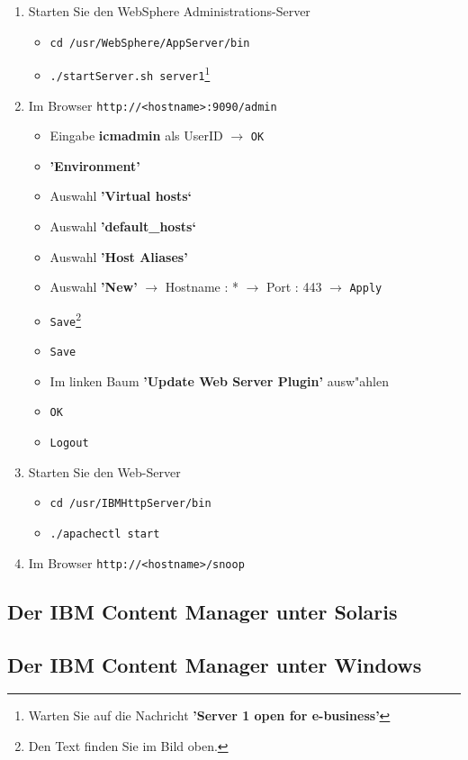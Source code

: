 \begin{enumerate}
\item Starten Sie den WebSphere Administrations-Server
\begin{itemize}
\item {\tt cd /usr/WebSphere/AppServer/bin}
\item {\tt ./startServer.sh server1}\footnote{Warten Sie auf die Nachricht {\bf 'Server 1 open for e-business'}}
\end{itemize}
\item Im Browser {\tt http://<hostname>:9090/admin}
\begin{itemize}
\item Eingabe {\bf icmadmin} als UserID $\rightarrow$ {\tt OK}
\item {\bf 'Environment'}
\item Auswahl {\bf 'Virtual hosts`}
\item Auswahl {\bf 'default\_hosts`}
\item Auswahl {\bf 'Host Aliases'}
\item Auswahl {\bf 'New'} $\rightarrow$ Hostname : * $\rightarrow$ Port : 443 $\rightarrow$ {\tt Apply}
\item {\tt Save}\footnote{Den Text finden Sie im Bild oben.}
\item {\tt Save}
\item Im linken Baum {\bf 'Update Web Server Plugin'} ausw"ahlen
\item {\tt OK}
\item {\tt Logout}
\end{itemize}
\item Starten Sie den Web-Server
\begin{itemize}
\item {\tt cd /usr/IBMHttpServer/bin}
\item {\tt ./apachectl start}
\end{itemize}
\item Im Browser {\tt http://<hostname>/snoop}
\end{enumerate}
%
%
\subsection{Der IBM Content Manager unter Solaris}

%
%
\subsection{Der IBM Content Manager unter Windows}

%
%

